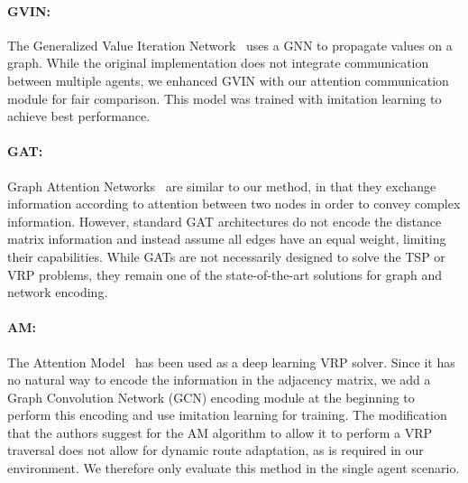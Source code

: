 \vspace{-0.1in}
\paragraph{GVIN:} The Generalized Value Iteration Network~\citep{gvin} uses a GNN to propagate
values on a graph. While the original implementation does not integrate communication between
multiple agents, we enhanced  GVIN with our attention communication module for fair comparison. This
model was trained with imitation learning to achieve  best performance.

\vspace{-0.1in}
\paragraph{GAT:} Graph Attention Networks~\citep{gat} are similar to our method, in that they
exchange information according to attention between two nodes in order to convey complex
information. However, standard GAT architectures do not encode the distance matrix information and
instead assume all edges have an equal weight, limiting their capabilities.
While GATs are not necessarily designed to solve the TSP or VRP problems,  they  remain
one of the state-of-the-art solutions for graph and network encoding.

\vspace{-0.1in}
\paragraph{AM:} The Attention Model~\citep{am}  has been used as a deep learning VRP solver. Since
it has no natural way to encode the information in the adjacency matrix, we add a Graph Convolution Network (GCN) %
encoding module at the beginning to perform this encoding and use imitation learning for training. The
modification that the authors suggest for the AM algorithm to allow it to perform a VRP traversal
does not allow for dynamic route adaptation, as is required in our environment. We therefore only
evaluate this method in the single agent scenario.

